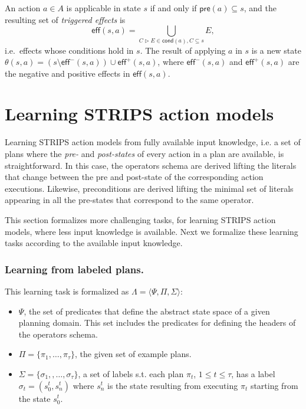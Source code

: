 \documentclass[letterpaper]{article} %
\newcommand{\tup}[1]{{\langle #1 \rangle}}
\newcommand{\pre}{\mathsf{pre}}     %
\newcommand{\eff}{\mathsf{eff}}     %
\newcommand{\cond}{\mathsf{cond}}   %
\begin{document}
An action $a\in A$ is applicable in state $s$ if and only if $\pre(a)\subseteq s$, and the resulting set of {\em triggered effects} is
\[
\eff(s,a)=\bigcup_{C\rhd E\in\cond(a),C\subseteq s} E,
\]
i.e.~effects whose conditions hold in $s$. The result of applying $a$ in $s$ is a new state $\theta(s,a)=(s\setminus \eff^-(s,a))\cup\eff^+(s,a)$, where $\eff^-(s,a)$ and $\eff^+(s,a)$ are the negative and positive effects in $\eff(s,a)$.


\section{Learning STRIPS action models}
Learning STRIPS action models from fully available input knowledge, i.e. a set of plans where the {\em pre-} and {\em post-states} of every action in a plan are available, is straightforward. In this case, the operators schema are derived lifting the literals that change between the pre and post-state of the corresponding action executions. Likewise, preconditions are derived lifting the minimal set of literals appearing in all the pre-states that correspond to the same operator.

This section formalizes more challenging tasks, for learning STRIPS action models, where less input knowledge is available. Next we formalize these learning tasks according to the available input knowledge.

\subsubsection{Learning from labeled plans.}
This learning task is formalized as $\Lambda=\tup{\Psi,\Pi,\Sigma}$: 
\begin{itemize}
\item $\Psi$, the set of predicates that define the abstract state space of a given planning domain. This set includes the predicates for defining the headers of the operators schema.
\item $\Pi=\{\pi_1,\ldots,\pi_{\tau}\}$, the given set of example plans.
\item $\Sigma=\{\sigma_1,,\ldots,\sigma_{\tau}\}$, a set of labels s.t. each plan $\pi_t$, {\small $1\leq t\leq \tau$}, has a label $\sigma_t=(s_0^t,s_{n}^t)$ where $s_{n}^t$ is the state resulting from executing $\pi_t$ starting from the state $s_0^t$. 
\end{itemize}
\end{document}
